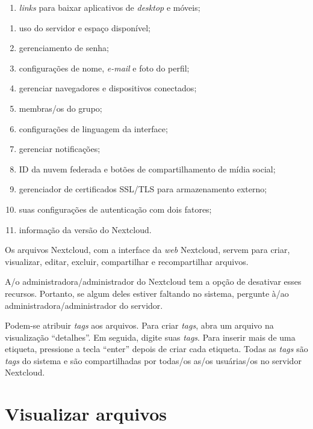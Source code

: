 \documentclass[openright, twoside, a4paper]{memoir}
\begin{document}
\begin{enumerate}
\def\labelenumi{\roman{enumi}.}
\item
    \emph{links} para baixar aplicativos de \emph{desktop} e móveis;
\end{enumerate}

\begin{enumerate}
\def\labelenumi{\roman{enumi}.}
\setcounter{enumi}{15}
\item
    uso do servidor e espaço disponível;
\item
    gerenciamento de senha;
\item
    configurações de nome, \emph{e-mail} e foto do perfil;
\item
    gerenciar navegadores e dispositivos conectados;
\item
    membras/os do grupo;
\item
    configurações de linguagem da interface;
\item
    gerenciar notificações;
\item
    ID da nuvem federada e botões de compartilhamento de mídia social;
\item
    gerenciador de certificados SSL/TLS para armazenamento externo;
\item
    suas configurações de autenticação com dois fatores;
\item
    informação da versão do Nextcloud.
\end{enumerate}

Os arquivos Nextcloud, com a interface da \emph{web} Nextcloud, servem
para criar, visualizar, editar, excluir, compartilhar e recompartilhar
arquivos.

A/o administradora/administrador do Nextcloud tem a opção de desativar
esses recursos. Portanto, se algum deles estiver faltando no sistema,
pergunte à/ao administradora/administrador do servidor.

Podem-se atribuir \emph{tags} aos arquivos. Para criar \emph{tags}, abra
um arquivo na visualização ``detalhes''. Em seguida, digite suas
\emph{tags}. Para inserir mais de uma etiqueta, pressione a tecla
``enter'' depois de criar cada etiqueta. Todas as \emph{tags} são
\emph{tags} do sistema e são compartilhadas por todas/os as/os
usuárias/os no servidor Nextcloud.

\section{Visualizar arquivos}
\end{document}
